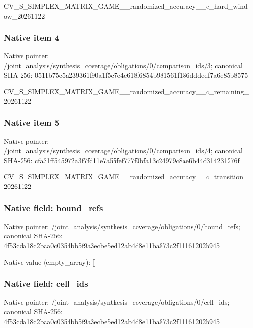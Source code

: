 \documentclass[10pt,a4paper]{article}
\begin{document}
CV\_S\_SIMPLEX\_MATRIX\_GAME\allowbreak{}\_\_randomized\_accuracy\_\_c\allowbreak{}\_hard\_window\_20261122


\subsubsection{Native item 4}


Native pointer: /joint\_analysis/synthesi\allowbreak{}s\_coverage/obligations/0\allowbreak{}/comparison\_ids/3; canonical SHA-256: 0511b75c5a239361f90a1f5c\allowbreak{}7e4e618f6854b981561f186d\allowbreak{}ddedf7a6e85b8575


CV\_S\_SIMPLEX\_MATRIX\_GAME\allowbreak{}\_\_randomized\_accuracy\_\_c\allowbreak{}\_remaining\_20261122


\subsubsection{Native item 5}


Native pointer: /joint\_analysis/synthesi\allowbreak{}s\_coverage/obligations/0\allowbreak{}/comparison\_ids/4; canonical SHA-256: cfa31ff545972a3f7fd11e7a\allowbreak{}55fef777f0bfa13c24979c8a\allowbreak{}e6b44d314231276f


CV\_S\_SIMPLEX\_MATRIX\_GAME\allowbreak{}\_\_randomized\_accuracy\_\_c\allowbreak{}\_transition\_20261122


\subsubsection{Native field: bound\_refs}


Native pointer: /joint\_analysis/synthesi\allowbreak{}s\_coverage/obligations/0\allowbreak{}/bound\_refs; canonical SHA-256: 4f53cda18c2baa0c0354bb5f\allowbreak{}9a3ecbe5ed12ab4d8e11ba87\allowbreak{}3c2f11161202b945



Native value (empty\_array): []



\subsubsection{Native field: cell\_ids}


Native pointer: /joint\_analysis/synthesi\allowbreak{}s\_coverage/obligations/0\allowbreak{}/cell\_ids; canonical SHA-256: 4f53cda18c2baa0c0354bb5f\allowbreak{}9a3ecbe5ed12ab4d8e11ba87\allowbreak{}3c2f11161202b945
\end{document}
